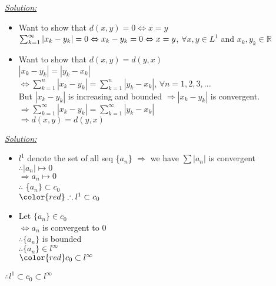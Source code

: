 \documentclass{book}
\begin{document}
\begin{tcolorbox}[enhanced,attach boxed title to top center={yshift=-3mm,yshifttext=-1mm},
colback=blue!5!white,colframe=blue!75!black,colbacktitle=red!80!black,
title=Exercise 35.5:,fonttitle=\bfseries,
boxed title style={size=small,colframe=red!50!black} ]
\textit{\color{blue}\underline{Solution:}}
\begin{itemize}
\item Want to show that $d(x,y)=0\Leftrightarrow x=y$\\
$\sum_{k=1}^{\infty}|x_k-y_k|=0\\ \Leftrightarrow x_k-y_k=0\\ \Leftrightarrow x=y$, $\forall x,y \in L^1$ 
and $ x_k,y_k \in \mathbb{R}$ 
\item Want to show that $d(x,y)=d(y,x)$\\
$|x_k-y_k|=|y_k-x_k|$\\
$\Leftrightarrow \sum_{k=1}^{n}|x_k-y_k|=\sum_{k=1}^{n}|y_k-x_k|$, $\forall n=1,2,3,...$\\
But $|x_k-y_k|$ is increasing and bounded $\Rightarrow |x_k-y_k|$ is convergent. \\
$\Rightarrow \sum_{k=1}^{\infty}|x_k-y_k|=\sum_{k=1}^{\infty}|y_k-x_k|$\\
$\Rightarrow d(x,y)=d(y,x)$
\end{itemize}
\end{tcolorbox}



\begin{tcolorbox}[enhanced,attach boxed title to top center={yshift=-3mm,yshifttext=-1mm},
colback=blue!5!white,colframe=blue!75!black,colbacktitle=red!80!black,
title=Exercise 35.6:,fonttitle=\bfseries,
boxed title style={size=small,colframe=red!50!black} ]
\textit{\color{blue}\underline{Solution:}}
\begin{itemize}
\item $l^1$ denote the set of all seq \{$a_n$\}
$\Rightarrow$ we have $\sum |a_n|$ is convergent\\
$\therefore |a_n|\mapsto 0$\\
$\Rightarrow a_n\mapsto 0$\\
$\therefore $ \{$a_n\} \subset c_0$\\
${\color{red} \therefore l^1\subset c_0}$
\item Let $\{ a_n\}\in c_0$\\
$\Leftrightarrow a_n$ is convergent to $0$\\
$\therefore \{a_n\}$ is bounded \\
$\therefore \{ a_n\}\in l^\infty$\\
${\color{red}c_0\subset l^\infty}$
\end{itemize}
\begin{center}
{\large \color{red} $\therefore l^1\subset c_0 \subset l^\infty$}
\end{center}
\end{tcolorbox}
\end{document}
